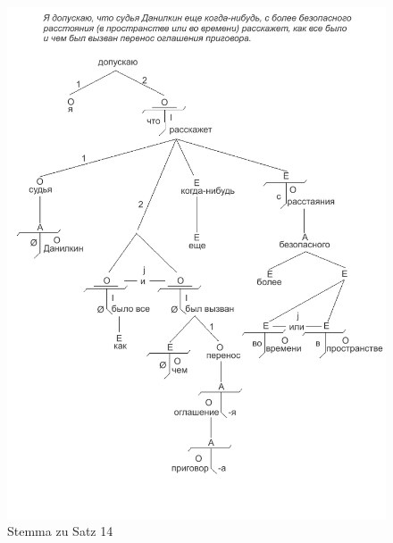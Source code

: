 
\begin{figure}
    \begin{center}
        \includegraphics{anhang_a/stemma14}
        \caption{Stemma zu Satz 14}
        \label{fig:stemma14}
    \end{center}
\end{figure}

